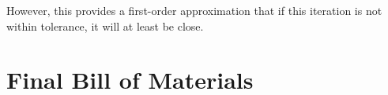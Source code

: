 \documentclass[12pt, letterpaper]{report}%
\newcounter{mycounter}           %
\newcounter{sub}[mycounter]      %
\newcommand{\dDdXTol}{$0.1\ \mu m$}
\newcommand{\dXdLTol}{$2.75\ \mu m$}
\begin{document}
        However, this provides a first-order approximation that if this iteration is not within tolerance, it will at least be close.
        

            


    
%
%
%

\chapter{Final Bill of Materials}
\label{sec:bom}

\end{document}
